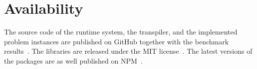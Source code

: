 \section{Availability}
The source code of the runtime system, the transpiler, and the implemented problem instances are published on GitHub together with the benchmark results~\cite{parallelEs, parallelEsBabel, parallelEsWebpack, parallelEsExample}. The libraries are released under the MIT license~\cite{mit}. The latest versions of the packages are as well published on NPM~\cite{npm}.

